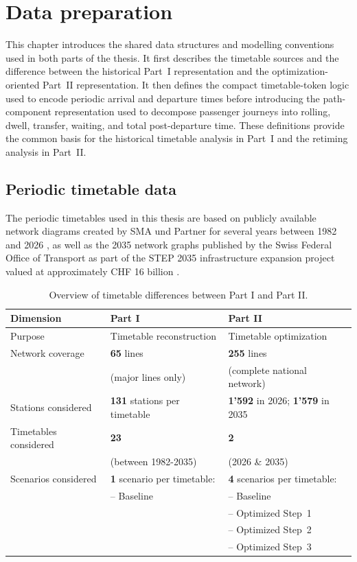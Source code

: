 \documentclass[preprint,12pt]{elsarticle}
\begin{document}
\section{Data preparation}\label{sec:dataprep}
This chapter introduces the shared data structures and modelling conventions used in both parts of the thesis. It first describes the timetable sources and the difference between the historical Part~I representation and the optimization-oriented Part~II representation. It then defines the compact timetable-token logic used to encode periodic arrival and departure times before introducing the path-component representation used to decompose passenger journeys into rolling, dwell, transfer, waiting, and total post-departure time. These definitions provide the common basis for the historical timetable analysis in Part~I and the retiming analysis in Part~II.

\subsection{Periodic timetable data}\label{sec:data}
The periodic timetables used in this thesis are based on publicly available network diagrams created by SMA und Partner for several years between 1982 and 2026 \citep{smaPartnerDownloads}, as well as the 2035 network graphs published by the Swiss Federal Office of Transport as part of the STEP 2035 infrastructure expansion project \citep{bav2021as2035} valued at approximately CHF 16 billion \citep{sbbStep2035}.
\begin{table}[htbp]
\centering
\caption[Part I and Part II timetable representations]{Overview of timetable differences between Part I and Part II.}
\label{tab:timetable-representations}
\begin{tabular}{lll}
\hline
\textbf{Dimension} & \textbf{Part I} & \textbf{Part II} \\
\hline
Purpose &
Timetable reconstruction &
Timetable optimization \\
\midrule
Network coverage &
\textbf{65} lines &
\textbf{255} lines \\&(major lines only)&(complete national network)\\
\midrule
Stations considered &
\textbf{131} stations per timetable &
\textbf{1'592} in 2026; \textbf{1'579} in 2035 \\
\midrule
Timetables considered &
\textbf{23} &\textbf{2}\\&(between 1982-2035) &
(2026 \& 2035) \\
\midrule
Scenarios considered &
\textbf{1} scenario per timetable: &
\textbf{4} scenarios per timetable: \\&
-- Baseline
&
-- Baseline\\&&-- Optimized Step~1 \\&&-- Optimized Step~2\\&&-- Optimized Step~3\\

\hline
\end{tabular}
\end{table}
\end{document}
